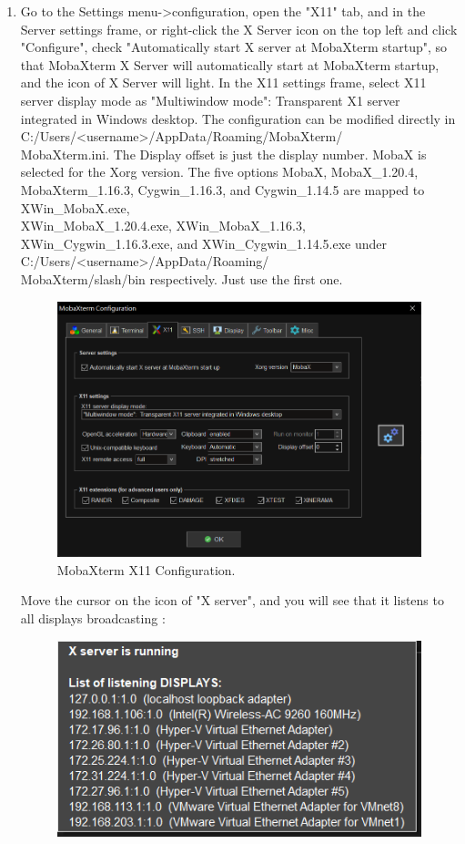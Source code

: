 \documentclass[a4paper,12pt,twoside]{article}
\begin{document}
\begin{enumerate}
    \item Go to the Settings menu->configuration, open the "X11" tab, and in the Server settings frame, or right-click the X Server icon on the top left and click "Configure", check "Automatically start X server at MobaXterm startup", so that MobaXterm X Server will automatically start at MobaXterm startup, and the icon of X Server will light. In the X11 settings frame, select X11 server display mode as "Multiwindow mode": Transparent X1 server integrated in Windows desktop. The configuration can be modified directly in C:/Users/<username>/AppData/Roaming/MobaXterm/\\
    MobaXterm.ini. The Display offset is just the display number. MobaX is selected for the Xorg version. The five options MobaX, MobaX\_1.20.4, MobaXterm\_1.16.3, Cygwin\_1.16.3, and Cygwin\_1.14.5 are mapped to XWin\_MobaX.exe,\\
    XWin\_MobaX\_1.20.4.exe, XWin\_MobaX\_1.16.3, XWin\_Cygwin\_1.16.3.exe, and XWin\_Cygwin\_1.14.5.exe under C:/Users/<username>/AppData/Roaming/\\
    MobaXterm/slash/bin respectively. Just use the first one.
    \begin{figure}[H]
        \centering
        \includegraphics[width=\textwidth]{images/12.png}
        \caption{MobaXterm X11 Configuration.}
    \end{figure}
    Move the cursor on the icon of "X server", and you will see that it listens to all displays broadcasting \cite{mobaxtermdoc}:
    \begin{figure}[H]
        \centering
        \includegraphics[width=\textwidth]{images/10.png}

\end{figure}
\end{enumerate}
\end{document}
